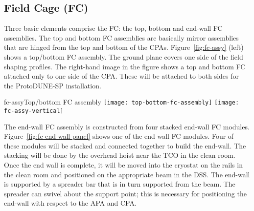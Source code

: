 


\subsection{Field Cage (FC)}


Three basic elements comprise the FC: the top, bottom and end-wall FC assemblies.  The top and bottom FC assemblies are basically mirror assemblies that are hinged from the top and bottom of the CPAs. %
Figure~\ref{fig:fc-assy} (left) shows a top/bottom FC assembly.  The ground plane covers one side of the field shaping profiles.  The right-hand image in the figure shows a top and bottom FC attached only to one side of the CPA. %
These will be attached to both sides for the ProtoDUNE-SP installation.  
\begin{cdrfigure}{fc-assy}{Top/bottom FC assembly }
\texttt{[image: top-bottom-fc-assembly]}
\texttt{[image: fc-assy-vertical]}
\end{cdrfigure}

The end-wall FC assembly is constructed from four stacked end-wall FC modules.  Figure~\ref{fig:fc-end-wall-panel} shows one of the end-wall FC modules.  Four of these modules will be stacked and connected together to build the end-wall.  
The stacking will be done by the overhead hoist near the TCO in the clean room.  Once the end wall is complete, it will be moved into the cryostat on the rails in the clean room and positioned on the appropriate beam in the DSS. 
The end-wall is supported by a spreader bar that is in turn supported from the beam. The spreader can swivel about the support point;  this is necessary for positioning the end-wall with respect to the APA and CPA. %

